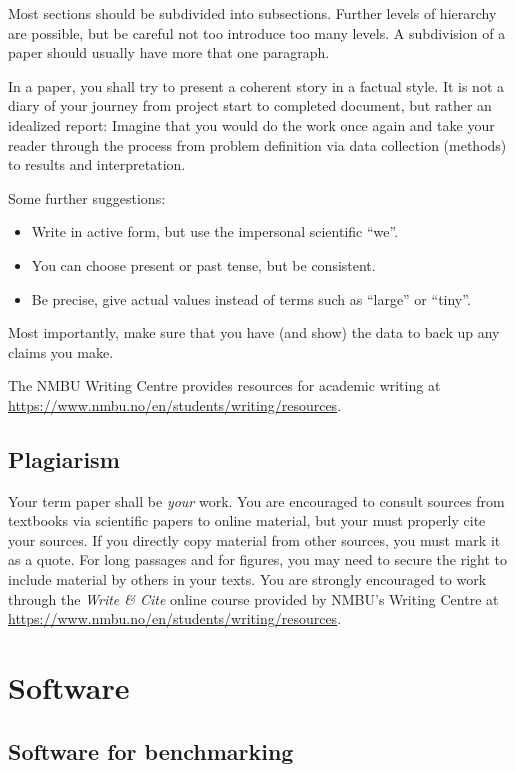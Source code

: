 \documentclass[sigconf, nonacm, natbib, screen, balance=False]{acmart}
\begin{document}
Most sections should be subdivided into subsections. Further levels of
hierarchy are possible, but be careful not too introduce too many
levels. A subdivision of a paper should usually have more that one
paragraph.

In a paper, you shall try to present a coherent story in a factual
style. It is not a diary of your journey from project start to
completed document, but rather an idealized report: Imagine that you
would do the work once again and take your reader through the process
from problem definition via data collection (methods) to results and
interpretation.

Some further suggestions:
\begin{itemize}
\item Write in active form, but use the impersonal
  scientific ``we''.
\item You can choose present or past tense, but be consistent.
\item Be precise, give actual values instead of terms such as
  ``large'' or ``tiny''.
\end{itemize}
Most importantly, make sure that you have (and show) the data to back
up any claims you make.

The NMBU Writing Centre provides resources for academic writing at \url{https://www.nmbu.no/en/students/writing/resources}.

\subsection{Plagiarism}\label{sec:plag}

Your term paper shall be \emph{your} work. You are encouraged to
consult sources from textbooks via scientific papers to online
material, but your must properly cite your sources. If you directly
copy material from other sources, you must mark it as a quote. For
long passages and for figures, you may need to secure the right to
include material by others in your texts. You are strongly encouraged
to work through the \emph{Write \& Cite} online course provided by
NMBU's Writing Centre at
\url{https://www.nmbu.no/en/students/writing/resources}.


\section{Software}\label{sec:sw}

\subsection{Software for benchmarking}\label{sec:swb}
\end{document}
